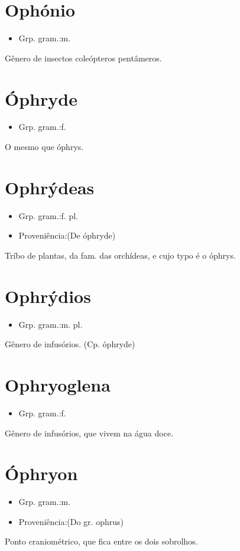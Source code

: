 \section{Ophónio}
\begin{itemize}
\item {Grp. gram.:m.}
\end{itemize}
Gênero de insectos coleópteros pentâmeros.
\section{Óphryde}
\begin{itemize}
\item {Grp. gram.:f.}
\end{itemize}
O mesmo que \textunderscore óphrys\textunderscore .
\section{Ophrýdeas}
\begin{itemize}
\item {Grp. gram.:f. pl.}
\end{itemize}
\begin{itemize}
\item {Proveniência:(De \textunderscore óphryde\textunderscore )}
\end{itemize}
Tríbo de plantas, da fam. das orchídeas, e cujo typo é o óphrys.
\section{Ophrýdios}
\begin{itemize}
\item {Grp. gram.:m. pl.}
\end{itemize}
Gênero de infusórios.
(Cp. \textunderscore óphryde\textunderscore )
\section{Ophryoglena}
\begin{itemize}
\item {Grp. gram.:f.}
\end{itemize}
Gênero de infusórios, que vivem na água doce.
\section{Óphryon}
\begin{itemize}
\item {Grp. gram.:m.}
\end{itemize}
\begin{itemize}
\item {Proveniência:(Do gr. \textunderscore ophrus\textunderscore )}
\end{itemize}
Ponto craniométrico, que fica entre os dois sobrolhos.

